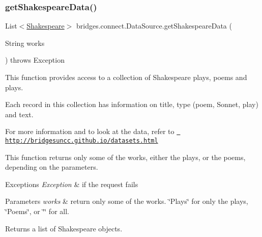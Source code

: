 \subsubsection{\texorpdfstring{getShakespeareData()}{getShakespeareData()}\hspace{0.1cm}{\footnotesize\ttfamily [2/3]}}
{\footnotesize\ttfamily List$<$\mbox{\hyperlink{classbridges_1_1data__src__dependent_1_1_shakespeare}{Shakespeare}}$>$ bridges.\+connect.\+Data\+Source.\+get\+Shakespeare\+Data (\begin{DoxyParamCaption}\item[{String}]{works }\end{DoxyParamCaption}) throws Exception}



This function provides access to a collection of Shakespeare plays, poems and plays. 

Each record in this collection has information on title, type (poem, Sonnet, play) and text.

For more information and to look at the data, refer to \href{http://bridgesuncc.github.io/datasets.html}{\texttt{ http\+://bridgesuncc.\+github.\+io/datasets.\+html}}

This function returns only some of the works, either the plays, or the poems, depending on the parameters.


\begin{DoxyExceptions}{Exceptions}
{\em Exception} & if the request fails\\
\hline
\end{DoxyExceptions}

\begin{DoxyParams}{Parameters}
{\em works} & return only some of the works. \char`\"{}\+Plays\char`\"{} for only the plays, \char`\"{}\+Poems\char`\"{}, or \char`\"{}\char`\"{} for all.\\
\hline
\end{DoxyParams}
\begin{DoxyReturn}{Returns}
a list of Shakespeare objects. 
\end{DoxyReturn}
\mbox{\label{classbridges_1_1connect_1_1_data_source_abf8e8f8ff3eb14fa6c6b5ce6b48dbadb}} 

